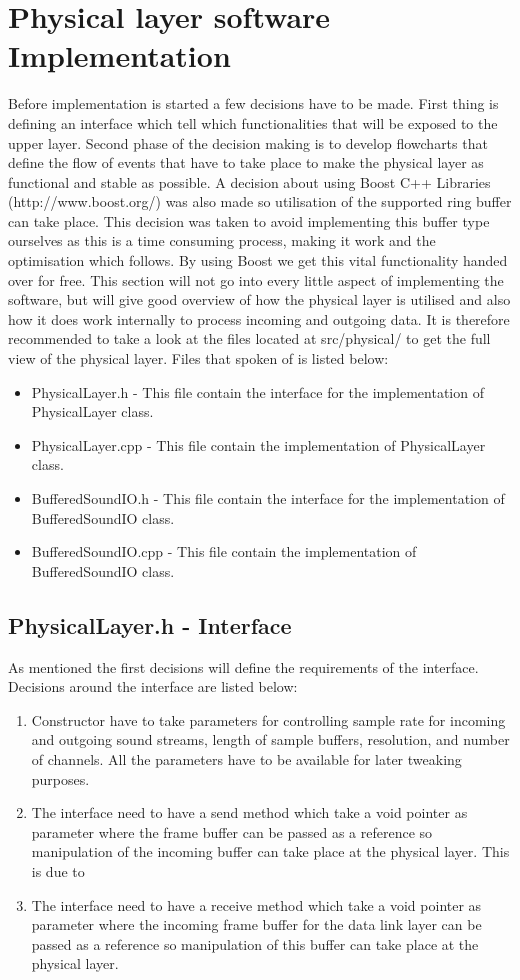 \section{Physical layer software Implementation}
Before implementation is started a few decisions have to be made. First thing is defining an interface which tell which functionalities
that will be exposed to the upper layer. Second phase of the decision making is to develop flowcharts that define the flow of events 
that have to take place to make the physical layer as functional and stable as possible. A decision about using Boost C++ Libraries
(http://www.boost.org/) was also made so utilisation of the supported ring buffer can take place. This decision was taken to avoid
implementing this buffer type ourselves as this is a time consuming process, making it work and the optimisation which follows.
By using Boost we get this vital functionality handed over for free. This section will not go into every little aspect of implementing
the software, but will give good overview of how the physical layer is utilised and also how it does work internally to process incoming 
and outgoing data. It is therefore recommended to take a look at the files located at src/physical/ to get the full view of the physical layer.
Files that spoken of is listed below:

\begin {itemize}
\item PhysicalLayer.h - This file contain the interface for the implementation of PhysicalLayer class.
\item PhysicalLayer.cpp - This file contain the implementation of PhysicalLayer class.
\item BufferedSoundIO.h - This file contain the interface for the implementation of BufferedSoundIO class.
\item BufferedSoundIO.cpp - This file contain the implementation of BufferedSoundIO class.
\end{itemize}

	\subsection{PhysicalLayer.h - Interface}
	As mentioned the first decisions will define the requirements of the interface. Decisions around the interface are listed below:
	\begin {enumerate}
	\item Constructor have to take parameters for controlling sample rate for incoming and outgoing sound streams, length of sample buffers,
	resolution, and number of channels. All the parameters have to be available for later tweaking purposes.
	\item The interface need to have a send method which take a void pointer as parameter where the frame buffer can be passed as a reference
	so manipulation of the incoming buffer can take place at the physical layer. This is due to 
	\item The interface need to have a receive method which take a void pointer as parameter where the incoming frame buffer for the data link
	layer can be passed as a reference so manipulation of this buffer can take place at the physical layer.
	\end{enumerate}
	
